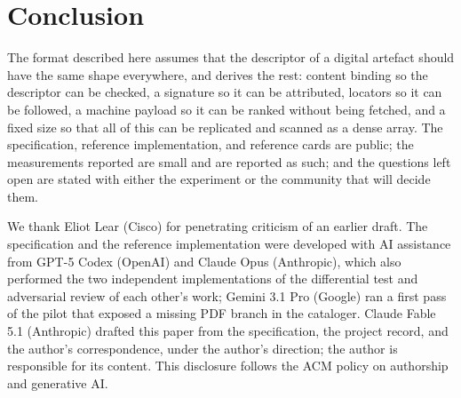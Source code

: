 \documentclass[sigconf]{acmart}
\begin{document}
\section{Conclusion}

The format described here assumes that the descriptor of a digital artefact
should have the same shape everywhere, and derives the rest: content binding
so the descriptor can be checked, a signature so it can be attributed,
locators so it can be followed, a machine payload so it can be ranked without
being fetched, and a fixed size so that all of this can be replicated and
scanned as a dense array. The specification, reference implementation, and
reference cards are public; the measurements reported are small and are
reported as such; and the questions left open are stated with either the
experiment or the community that will decide them.

\begin{acks}
We thank Eliot Lear (Cisco) for penetrating criticism of an earlier draft.
The specification and the reference implementation were developed with AI
assistance from GPT-5 Codex (OpenAI) and Claude Opus (Anthropic), which also
performed the two independent implementations of the differential test and
adversarial review of each other's work; Gemini 3.1 Pro (Google) ran a first
pass of the pilot that exposed a missing PDF branch in the cataloger. Claude
Fable 5.1 (Anthropic) drafted this paper from the specification, the project
record, and the author's correspondence, under the author's direction; the
author is responsible for its content. This disclosure follows the ACM policy
on authorship and generative AI.
\end{acks}



\end{document}
